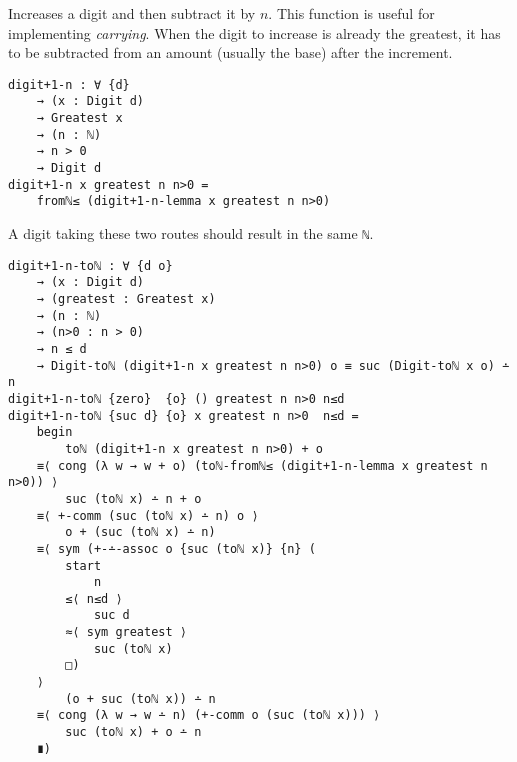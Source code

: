 \documentclass[\main/thesis.tex]{subfiles}
\begin{document}
Increases a digit and then subtract it by $ n $.
This function is useful for implementing \textit{carrying}.
When the digit to increase is already the greatest,
it has to be subtracted from an amount (usually the base) after the increment.

\begin{lstlisting}
digit+1-n : ∀ {d}
    → (x : Digit d)
    → Greatest x
    → (n : ℕ)
    → n > 0
    → Digit d
digit+1-n x greatest n n>0 =
    fromℕ≤ (digit+1-n-lemma x greatest n n>0)
\end{lstlisting}

\begin{center}
\end{center}

A digit taking these two routes should result in the same {{\lstinline|ℕ|}}.

\begin{lstlisting}[basicstyle=\ttfamily\scriptsize]
digit+1-n-toℕ : ∀ {d o}
    → (x : Digit d)
    → (greatest : Greatest x)
    → (n : ℕ)
    → (n>0 : n > 0)
    → n ≤ d
    → Digit-toℕ (digit+1-n x greatest n n>0) o ≡ suc (Digit-toℕ x o) ∸ n
digit+1-n-toℕ {zero}  {o} () greatest n n>0 n≤d
digit+1-n-toℕ {suc d} {o} x greatest n n>0  n≤d =
    begin
        toℕ (digit+1-n x greatest n n>0) + o
    ≡⟨ cong (λ w → w + o) (toℕ-fromℕ≤ (digit+1-n-lemma x greatest n n>0)) ⟩
        suc (toℕ x) ∸ n + o
    ≡⟨ +-comm (suc (toℕ x) ∸ n) o ⟩
        o + (suc (toℕ x) ∸ n)
    ≡⟨ sym (+-∸-assoc o {suc (toℕ x)} {n} (
        start
            n
        ≤⟨ n≤d ⟩
            suc d
        ≈⟨ sym greatest ⟩
            suc (toℕ x)
        □)
    ⟩
        (o + suc (toℕ x)) ∸ n
    ≡⟨ cong (λ w → w ∸ n) (+-comm o (suc (toℕ x))) ⟩
        suc (toℕ x) + o ∸ n
    ∎)
\end{lstlisting}
\end{document}
